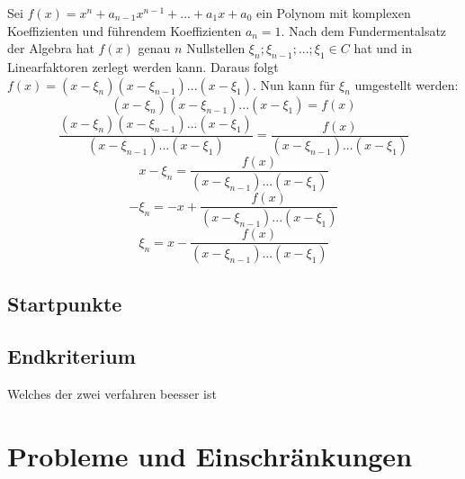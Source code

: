 \documentclass[12pt]{article}
\begin{document}
Sei $f(x) = x^n + a_{n-1} x^{n-1} + ... + a_1 x + a_0$ ein Polynom mit komplexen Koeffizienten und führendem Koeffizienten $a_n = 1$. Nach dem Fundermentalsatz der Algebra hat $f(x)$ genau $n$ Nullstellen $\xi_n;\xi_{n-1};...;\xi_1 \in C$ hat und in Linearfaktoren zerlegt werden kann. Daraus folgt $f(x) = (x - \xi_n)(x - \xi_{n-1})...(x - \xi_1)$. Nun kann für $\xi_n$ umgestellt werden:
\begin{displaymath}
    (x - \xi_n)(x - \xi_{n-1})...(x - \xi_1) = f(x)
\end{displaymath}
\begin{displaymath}
    \frac{(x - \xi_n)(x - \xi_{n-1})...(x - \xi_1)}{(x - \xi_{n-1})...(x - \xi_1)} = \frac{f(x)}{(x - \xi_{n-1})...(x - \xi_1)}
\end{displaymath}
\begin{displaymath}
    x - \xi_n = \frac{f(x)}{(x - \xi_{n-1})...(x - \xi_1)}
\end{displaymath}
\begin{displaymath}
    - \xi_n = - x + \frac{f(x)}{(x - \xi_{n-1})...(x - \xi_1)}
\end{displaymath}
\begin{displaymath}
    \xi_n = x - \frac{f(x)}{(x - \xi_{n-1})...(x - \xi_1)}
\end{displaymath}

\subsection{Startpunkte}

\subsection{Endkriterium}
Welches der zwei verfahren beesser ist

\section{Probleme und Einschränkungen}
\end{document}
